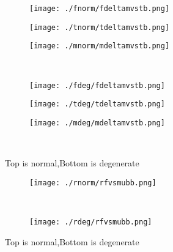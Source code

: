 \documentclass[aps,floats,floatfix,nofootinbib]{revtex4-1}
\begin{document}
\begin{center}
\begin{figure}
\begin{subfigure}{0.3\textwidth}
\texttt{[image: ./fnorm/fdeltamvstb.png]}
\label{}
\end{subfigure}
\begin{subfigure}{0.3\textwidth}
\texttt{[image: ./tnorm/tdeltamvstb.png]}
\label{}
\end{subfigure}
\begin{subfigure}{0.3\textwidth}
\texttt{[image: ./mnorm/mdeltamvstb.png]}
\label{}
\end{subfigure}\\
\begin{subfigure}{0.3\textwidth}
\texttt{[image: ./fdeg/fdeltamvstb.png]}
\label{}
\end{subfigure}
\begin{subfigure}{0.3\textwidth}
\texttt{[image: ./tdeg/tdeltamvstb.png]}
\label{}
\end{subfigure}
\begin{subfigure}{0.3\textwidth}
\texttt{[image: ./mdeg/mdeltamvstb.png]}
\label{}
\end{subfigure}\\
\caption{Top is normal,Bottom is degenerate}
\end{figure}
\end{center}

\begin{center}
\begin{figure}
\begin{subfigure}{1.0\textwidth}
\texttt{[image: ./rnorm/rfvsmubb.png]}
\label{}
\end{subfigure}\\
\begin{subfigure}{1.0\textwidth}
\texttt{[image: ./rdeg/rfvsmubb.png]}
\label{}
\end{subfigure}
\caption{Top is normal,Bottom is degenerate}
\end{figure}
\end{center}
\end{document}
